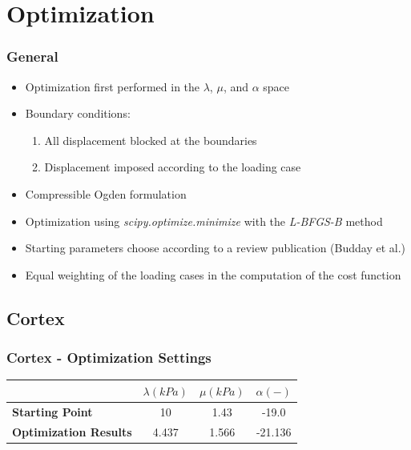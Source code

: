 \documentclass{beamer}
\begin{document}
\section{Optimization}

\begin{frame}
\frametitle{General}
\begin{itemize}
\item
Optimization first performed in the $\lambda$, $\mu$, and $\alpha$ space
\item
Boundary conditions:\begin{enumerate}
\item
All displacement blocked at the boundaries
\item
Displacement imposed according to the loading case
\end{enumerate}
\item
Compressible Ogden formulation
\item
Optimization using \textit{scipy.optimize.minimize} with the \textit{L-BFGS-B} method
\item
Starting parameters choose according to a review publication (Budday et al.)
\item
Equal weighting of the loading cases in the computation of the cost function
\end{itemize}
\end{frame}

\subsection{Cortex}
\begin{frame}
\frametitle{Cortex - Optimization Settings}
	\begin{table}[h!]
	\centering
		\begin{tabular}{lccc}
		\toprule
		& \textbf{$\lambda (kPa)$} & \textbf{$\mu (kPa)$} & \textbf{$\alpha (-)$}\\
		\midrule
		\textbf{Starting Point} & 10 & 1.43 & -19.0 \\
		\textbf{Optimization Results} & 4.437 & 1.566 & -21.136 \\
		\bottomrule
		\end{tabular}
	\end{table}
\end{frame}
\end{document}
